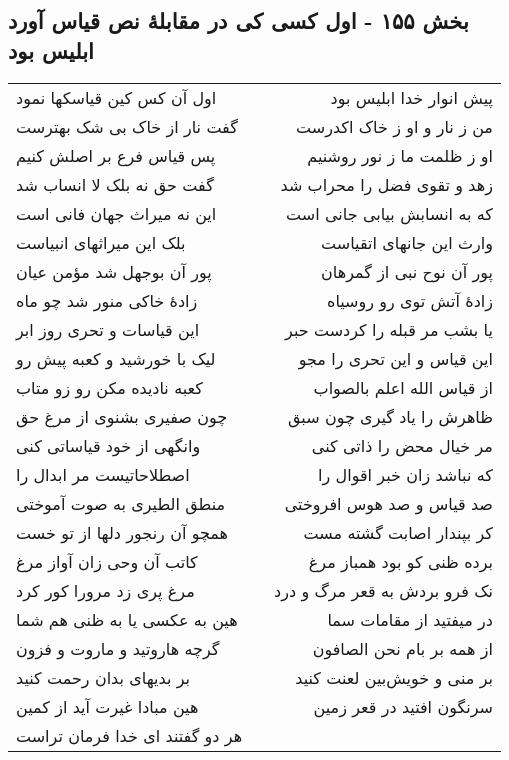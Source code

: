 \begin{center}
\section*{بخش ۱۵۵ - اول کسی کی در مقابلهٔ نص قیاس آورد ابلیس بود}
\label{sec:sh155}
\begin{longtable}{l p{0.5cm} r}
اول آن کس کین قیاسکها نمود
&&
پیش انوار خدا ابلیس بود
\\
گفت نار از خاک بی شک بهترست
&&
من ز نار و او ز خاک اکدرست
\\
پس قیاس فرع بر اصلش کنیم
&&
او ز ظلمت ما ز نور روشنیم
\\
گفت حق نه بلک لا انساب شد
&&
زهد و تقوی فضل را محراب شد
\\
این نه میراث جهان فانی است
&&
که به انسابش بیابی جانی است
\\
بلک این میراثهای انبیاست
&&
وارث این جانهای اتقیاست
\\
پور آن بوجهل شد مؤمن عیان
&&
پور آن نوح نبی از گمرهان
\\
زادهٔ خاکی منور شد چو ماه
&&
زادهٔ آتش توی رو روسیاه
\\
این قیاسات و تحری روز ابر
&&
یا بشب مر قبله را کردست حبر
\\
لیک با خورشید و کعبه پیش رو
&&
این قیاس و این تحری را مجو
\\
کعبه نادیده مکن رو زو متاب
&&
از قیاس الله اعلم بالصواب
\\
چون صفیری بشنوی از مرغ حق
&&
ظاهرش را یاد گیری چون سبق
\\
وانگهی از خود قیاساتی کنی
&&
مر خیال محض را ذاتی کنی
\\
اصطلاحاتیست مر ابدال را
&&
که نباشد زان خبر اقوال را
\\
منطق الطیری به صوت آموختی
&&
صد قیاس و صد هوس افروختی
\\
همچو آن رنجور دلها از تو خست
&&
کر بپندار اصابت گشته مست
\\
کاتب آن وحی زان آواز مرغ
&&
برده ظنی کو بود همباز مرغ
\\
مرغ پری زد مرورا کور کرد
&&
نک فرو بردش به قعر مرگ و درد
\\
هین به عکسی یا به ظنی هم شما
&&
در میفتید از مقامات سما
\\
گرچه هاروتید و ماروت و فزون
&&
از همه بر بام نحن الصافون
\\
بر بدیهای بدان رحمت کنید
&&
بر منی و خویش‌بین لعنت کنید
\\
هین مبادا غیرت آید از کمین
&&
سرنگون افتید در قعر زمین
\\
هر دو گفتند ای خدا فرمان تراست

\end{longtable}
\end{center}
